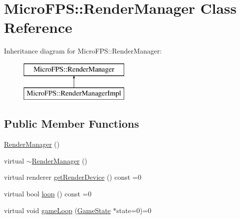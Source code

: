 \hypertarget{class_micro_f_p_s_1_1_render_manager}{
\section{MicroFPS::RenderManager Class Reference}
\label{d2/dad/class_micro_f_p_s_1_1_render_manager}
}
Inheritance diagram for MicroFPS::RenderManager:\begin{figure}[H]
\begin{center}
\leavevmode
\includegraphics[height=2.000000cm]{d2/dad/class_micro_f_p_s_1_1_render_manager}
\end{center}
\end{figure}
\subsection*{Public Member Functions}
\begin{DoxyCompactItemize}
\item 
\hyperlink{class_micro_f_p_s_1_1_render_manager_aa5cfdf42a7aeed598d8cd6b406ba2224}{RenderManager} ()
\item 
virtual \hyperlink{class_micro_f_p_s_1_1_render_manager_aee2394d07bc912d3165fe4dbd4a456dd}{$\sim$RenderManager} ()
\item 
virtual renderer \hyperlink{class_micro_f_p_s_1_1_render_manager_acb0e88bc424463200c4bdf451ea3c3ad}{getRenderDevice} () const =0
\item 
virtual bool \hyperlink{class_micro_f_p_s_1_1_render_manager_a32778d202b6dcde145be54846a6a9a64}{loop} () const =0
\item 
virtual void \hyperlink{class_micro_f_p_s_1_1_render_manager_af258ceee6bf336eaf765c9178ef5becc}{gameLoop} (\hyperlink{class_micro_f_p_s_1_1_game_state}{GameState} $\ast$state=0)=0
\end{DoxyCompactItemize}


